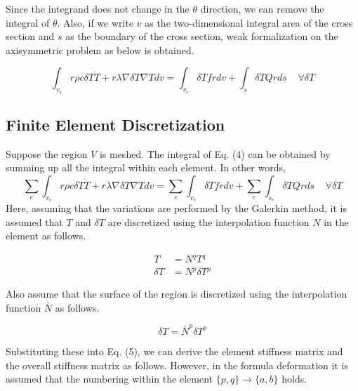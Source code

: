 Since the integrand does not change in the $\theta$ direction, we can remove the integral of $\theta$. Also, if we write $v$ as the two-dimensional integral area of ​​the cross section and $s$ as the boundary of the cross section, weak formalization on the axisymmetric problem as below is obtained.

\begin{tcolorbox}[title=Weak form of thermal diffusion equation for axisymmetric problem]
\begin{equation}
\int_{v_e} r\rho c \delta T\dot{T}  + r \lambda\nabla\delta T\nabla T dv = \int_{v_e} \delta T f rdv + \int_s  \delta T Q rds\;\;\;\;\forall\delta T
\end{equation}
\end{tcolorbox}


\subsection{Finite Element Discretization}
Suppose the region $V$ is meshed. The integral of Eq. (4) can be obtained by summing up all the integral within each element. In other words,
%
\begin{equation}
\sum_e\int_{v_e} r\rho c \delta T\dot{T}  + r\lambda\nabla\delta T\nabla T dv = \sum_e\int_{v_e} \delta T f rdv + \sum_e\int_{s_e}  \delta T Q rds\;\;\;\;\forall\delta T
\end{equation}
%
Here, assuming that the variations are performed by the Galerkin method, it is assumed that $T$ and $\delta T$ are discretized using the interpolation function $N$ in the element as follows.

\begin{align}
T &= N^q T^q\\
\delta T &= N^p \delta T^p
\end{align}


Also assume that the surface of the region is discretized using the interpolation function $\bar{N}$ as follows.

\begin{equation}
\delta T = \bar{N}^p \delta T^p
\end{equation}

Substituting these into Eq. (5), we can derive the element stiffness matrix and the overall stiffness matrix as follows. However, in the formula deformation it is assumed that the numbering within the element $\{p,q\}\rightarrow \{a,b\}$ holds.

